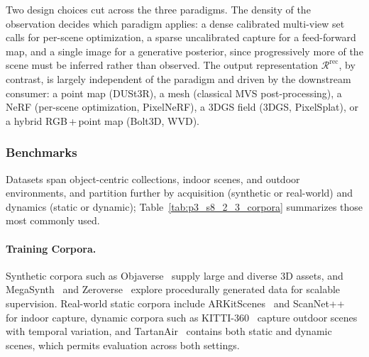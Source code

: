 Two design choices cut across the three paradigms.
The density of the observation decides which paradigm applies: a dense calibrated multi-view set calls for per-scene optimization, a sparse uncalibrated capture for a feed-forward map, and a single image for a generative posterior, since progressively more of the scene must be inferred rather than observed.
The output representation $\mathcal{R}^{\text{rec}}$, by contrast, is largely independent of the paradigm and driven by the downstream consumer: a point map (DUSt3R), a mesh (classical MVS post-processing), a NeRF (per-scene optimization, PixelNeRF), a 3DGS field (3DGS, PixelSplat), or a hybrid RGB\,+\,point map (Bolt3D, WVD).


\subsubsection{Benchmarks}
\label{subsubsec:p3_s8_2_3_benchmarks}

Datasets span object-centric collections, indoor scenes, and outdoor environments, and partition further by acquisition (synthetic or real-world) and dynamics (static or dynamic); Table~\ref{tab:p3_s8_2_3_corpora} summarizes those most commonly used.

\paragraph{Training Corpora.}
Synthetic corpora such as Objaverse~\cite{deitke2023objaverse} supply large and diverse 3D assets, and MegaSynth~\cite{jiang2025megasynth} and Zeroverse~\cite{xie2024lrmzero} explore procedurally generated data for scalable supervision.
Real-world static corpora include ARKitScenes~\cite{baruch2021arkitscenes} and ScanNet++~\cite{yeshwanth2023scannet++} for indoor capture, dynamic corpora such as KITTI-360~\cite{liao2022kitti360} capture outdoor scenes with temporal variation, and TartanAir~\cite{TartanAir} contains both static and dynamic scenes, which permits evaluation across both settings.

